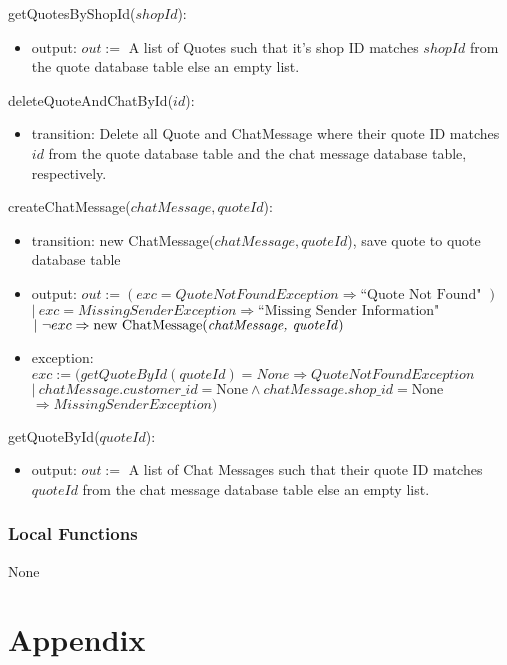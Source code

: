 \documentclass[12pt, titlepage]{article}
\begin{document}
\noindent getQuotesByShopId($shopId$):
\begin{itemize}
	\item output: $out :=$ A list of Quotes such that it's shop ID matches $shopId$ from the quote database
	      table else an empty list.
\end{itemize}

\noindent deleteQuoteAndChatById($id$):
\begin{itemize}
	\item transition: Delete all Quote and ChatMessage where their quote ID matches $id$ from the quote
	      database table and the chat message database table, respectively.
\end{itemize}

\noindent createChatMessage($chatMessage, quoteId$):
\begin{itemize}
	\item transition: new ChatMessage($chatMessage, quoteId$), save quote to quote database table
	\item output: $out := (exc = QuoteNotFoundException \Rightarrow \text{``Quote Not Found" })$ \\ $|\ exc =
		      MissingSenderException \Rightarrow \text{``Missing Sender Information" }$ \\ $|\ \neg exc
		      \Rightarrow \text{new ChatMessage(\emph{chatMessage, quoteId})}$
	\item exception: $exc := (getQuoteById(quoteId) = None \Rightarrow QuoteNotFoundException$ \\ $ |\
		      chatMessage.customer\_id = \text{None} \land chatMessage.shop\_id = \text{None}$ \\ $\Rightarrow
		      MissingSenderException)$
\end{itemize}

\noindent getQuoteById($quoteId$):
\begin{itemize}
	\item output: $out :=$ A list of Chat Messages such that their quote ID matches $quoteId$ from the chat
	      message database table else an empty list.
\end{itemize}

\subsubsection{Local Functions}

None

\newpage




\newpage

\section{Appendix}

\end{document}
